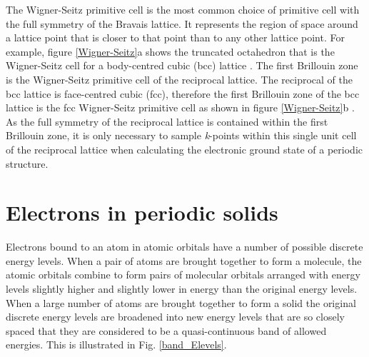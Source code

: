 \documentclass[11pt, twoside]{report}
\begin{document}
The Wigner-Seitz primitive cell is the most common choice of primitive cell with the full symmetry of the Bravais lattice. It represents the region of space around a lattice point  that is closer to that point than to any other lattice point. For example, figure \ref{Wigner-Seitz}a shows the truncated octahedron that is the Wigner-Seitz cell for a body-centred cubic (bcc) lattice \cite{AshcroftMermin2}.
The first Brillouin zone is the Wigner-Seitz primitive cell of the reciprocal lattice. The reciprocal of the bcc lattice is face-centred cubic (fcc), therefore the first Brillouin zone of the bcc lattice is the fcc Wigner-Seitz primitive cell as shown in figure \ref{Wigner-Seitz}b \cite{AshcroftMermin3}. As the full symmetry of the reciprocal lattice is contained within the first Brillouin zone, it is only necessary to sample \textit{k}-points within this single unit cell of the reciprocal lattice when calculating the electronic ground state of a periodic structure.



\section{Electrons in periodic solids}\label{BandTheorySection}


Electrons bound to an atom in atomic orbitals have a number of possible discrete energy levels. When a pair of atoms are brought together to form a molecule, the atomic orbitals combine to form pairs of molecular orbitals arranged with energy levels slightly higher and slightly lower in energy than the original energy levels. When a large number of atoms are brought together to form a solid the 
original discrete energy levels are broadened into new energy levels that are so closely spaced that they are considered to be a quasi-continuous band of allowed energies. This is illustrated in Fig. \ref{band_Elevels}. 
\end{document}
